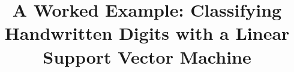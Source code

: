 \newcommand{\scitexmanuscripttitle}{%
A Worked Example: Classifying Handwritten Digits with a Linear Support Vector Machine
}
\title{\scitexmanuscripttitle}

